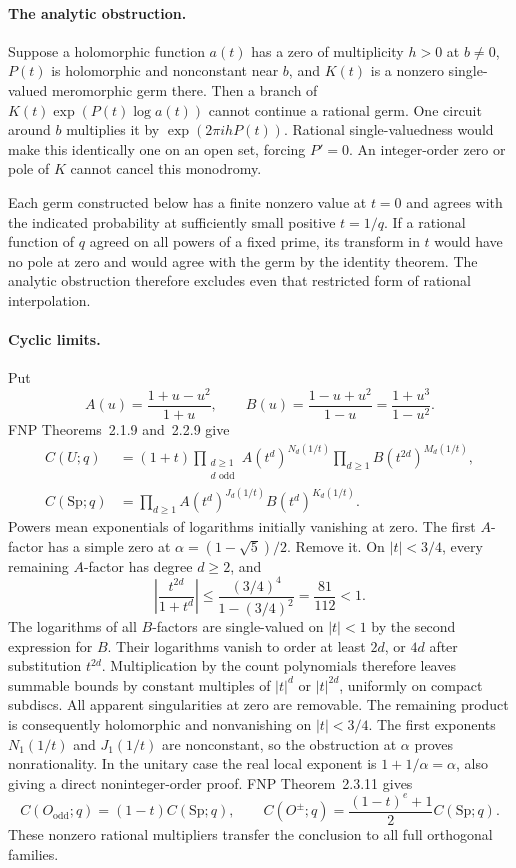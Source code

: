 \paragraph{The analytic obstruction.}
Suppose a holomorphic function \(a(t)\) has a zero of multiplicity
\(h>0\) at \(b\ne0\), \(P(t)\) is holomorphic and nonconstant near
\(b\), and \(K(t)\) is a nonzero single-valued meromorphic germ there.
Then a branch of \(K(t)\exp(P(t)\log a(t))\) cannot continue a rational
germ. One circuit around \(b\) multiplies it by
\(\exp(2\pi i hP(t))\). Rational single-valuedness would make this
identically one on an open set, forcing \(P'=0\).
An integer-order zero or pole of \(K\) cannot cancel this monodromy.

Each germ constructed below has a finite nonzero value at \(t=0\)
and agrees with the indicated probability at sufficiently small
positive \(t=1/q\). If a rational function of \(q\) agreed on all
powers of a fixed prime, its transform in \(t\) would have no pole
at zero and would agree with the germ by the identity theorem.
The analytic obstruction therefore excludes even that restricted
form of rational interpolation.

\paragraph{Cyclic limits.}
Put
\[
 A(u)=\frac{1+u-u^2}{1+u},\qquad
 B(u)=\frac{1-u+u^2}{1-u}=\frac{1+u^3}{1-u^2}.
\]
FNP Theorems~2.1.9 and~2.2.9 give
\[
\begin{aligned}
 C(U;q)&=(1+t)
   \prod_{\substack{d\ge1\\d\text{ odd}}}A(t^d)^{N_d(1/t)}
   \prod_{d\ge1}B(t^{2d})^{M_d(1/t)},\\
 C(\mathrm{Sp};q)&=
   \prod_{d\ge1}A(t^d)^{J_d(1/t)}B(t^d)^{K_d(1/t)}.
\end{aligned}
\]
Powers mean exponentials of logarithms initially vanishing at zero.
The first \(A\)-factor has a simple zero at
\(\alpha=(1-\sqrt5)/2\).
Remove it. On \(|t|<3/4\), every remaining \(A\)-factor has
degree \(d\ge2\), and
\[
 \left|\frac{t^{2d}}{1+t^d}\right|
 \le\frac{(3/4)^4}{1-(3/4)^2}=\frac{81}{112}<1.
\]
The logarithms of all \(B\)-factors are single-valued on \(|t|<1\)
by the second expression for \(B\).
Their logarithms vanish to order at least \(2d\), or \(4d\) after
substitution \(t^{2d}\). Multiplication by the count polynomials
therefore leaves summable bounds by constant multiples of
\(|t|^d\) or \(|t|^{2d}\), uniformly on compact subdiscs.
All apparent singularities at zero are removable.
The remaining product is consequently holomorphic and nonvanishing
on \(|t|<3/4\). The first exponents \(N_1(1/t)\) and \(J_1(1/t)\)
are nonconstant, so the obstruction at \(\alpha\) proves
nonrationality. In the unitary case the real local exponent is
\(1+1/\alpha=\alpha\), also giving a direct noninteger-order proof.
FNP Theorem~2.3.11 gives
\[
 C(O_{\mathrm{odd}};q)=(1-t)C(\mathrm{Sp};q),\qquad
 C(O^\pm;q)=\frac{(1-t)^e+1}{2}C(\mathrm{Sp};q).
\]
These nonzero rational multipliers transfer the conclusion to all
full orthogonal families.

